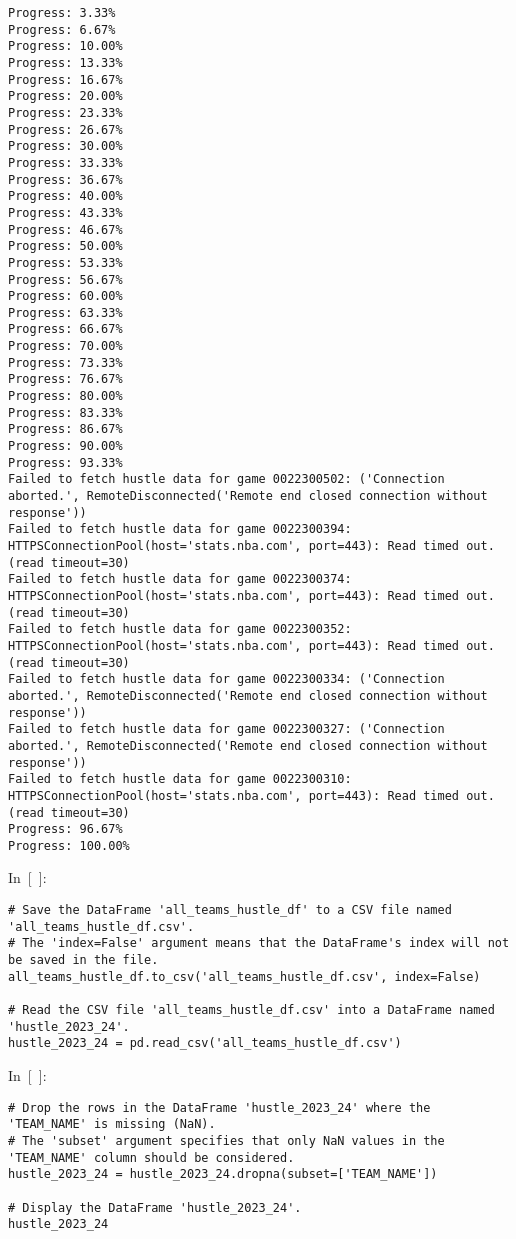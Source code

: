 \begin{verbatim}
Progress: 3.33%
Progress: 6.67%
Progress: 10.00%
Progress: 13.33%
Progress: 16.67%
Progress: 20.00%
Progress: 23.33%
Progress: 26.67%
Progress: 30.00%
Progress: 33.33%
Progress: 36.67%
Progress: 40.00%
Progress: 43.33%
Progress: 46.67%
Progress: 50.00%
Progress: 53.33%
Progress: 56.67%
Progress: 60.00%
Progress: 63.33%
Progress: 66.67%
Progress: 70.00%
Progress: 73.33%
Progress: 76.67%
Progress: 80.00%
Progress: 83.33%
Progress: 86.67%
Progress: 90.00%
Progress: 93.33%
Failed to fetch hustle data for game 0022300502: ('Connection aborted.', RemoteDisconnected('Remote end closed connection without response'))
Failed to fetch hustle data for game 0022300394: HTTPSConnectionPool(host='stats.nba.com', port=443): Read timed out. (read timeout=30)
Failed to fetch hustle data for game 0022300374: HTTPSConnectionPool(host='stats.nba.com', port=443): Read timed out. (read timeout=30)
Failed to fetch hustle data for game 0022300352: HTTPSConnectionPool(host='stats.nba.com', port=443): Read timed out. (read timeout=30)
Failed to fetch hustle data for game 0022300334: ('Connection aborted.', RemoteDisconnected('Remote end closed connection without response'))
Failed to fetch hustle data for game 0022300327: ('Connection aborted.', RemoteDisconnected('Remote end closed connection without response'))
Failed to fetch hustle data for game 0022300310: HTTPSConnectionPool(host='stats.nba.com', port=443): Read timed out. (read timeout=30)
Progress: 96.67%
Progress: 100.00%
\end{verbatim}

In~{[}~{]}:

\begin{verbatim}
# Save the DataFrame 'all_teams_hustle_df' to a CSV file named 'all_teams_hustle_df.csv'. 
# The 'index=False' argument means that the DataFrame's index will not be saved in the file.
all_teams_hustle_df.to_csv('all_teams_hustle_df.csv', index=False)

# Read the CSV file 'all_teams_hustle_df.csv' into a DataFrame named 'hustle_2023_24'.
hustle_2023_24 = pd.read_csv('all_teams_hustle_df.csv')
\end{verbatim}

In~{[}~{]}:

\begin{verbatim}
# Drop the rows in the DataFrame 'hustle_2023_24' where the 'TEAM_NAME' is missing (NaN).
# The 'subset' argument specifies that only NaN values in the 'TEAM_NAME' column should be considered.
hustle_2023_24 = hustle_2023_24.dropna(subset=['TEAM_NAME'])

# Display the DataFrame 'hustle_2023_24'.
hustle_2023_24
\end{verbatim}

